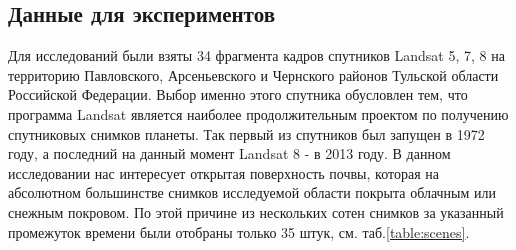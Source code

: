 \documentclass[14pt]{extarticle}
\begin{document}
\subsection{Данные для экспериментов}

\par
Для исследований были взяты 34 фрагмента кадров спутников Landsat 5, 7, 8 
на территорию Павловского, Арсеньевского и Чернского районов Тульской области Российской Федерации.
Выбор именно этого спутника обусловлен тем, что программа Landsat является наиболее
продолжительным проектом по получению спутниковых снимков планеты. Так первый из спутников
был запущен в 1972 году, а последний на данный момент Landsat 8 - в 2013 году.
В данном исследовании нас интересует открытая поверхность почвы, которая на абсолютном
большинстве снимков исследуемой области покрыта облачным или снежным покровом.
По этой причине из нескольких сотен снимков за указанный промежуток времени были
отобраны только 35 штук, см. таб.\ref{table:scenes}.
\end{document}
